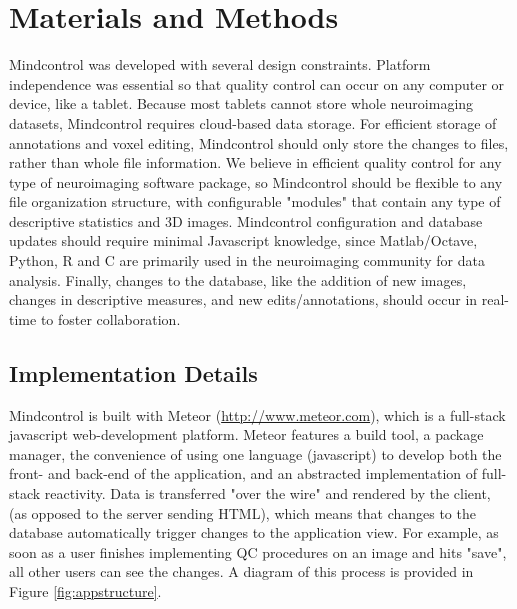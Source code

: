 \section{Materials and Methods}

Mindcontrol was developed with several design constraints. Platform independence was essential so that quality control can occur on any computer or device, like a tablet. Because most tablets cannot store whole neuroimaging datasets, Mindcontrol requires cloud-based data storage. For efficient storage of annotations and voxel editing, Mindcontrol should only store the changes to files, rather than whole file information. We believe in efficient quality control for any type of neuroimaging software package, so Mindcontrol should be flexible to any file organization structure, with configurable "modules" that contain any type of descriptive statistics and 3D images. Mindcontrol configuration and database updates should require minimal Javascript knowledge, since Matlab/Octave, Python, R and C are primarily used in the neuroimaging community for data analysis. Finally, changes to the database, like the addition of new images, changes in descriptive measures, and new edits/annotations, should occur in real-time to foster collaboration.  


\subsection{Implementation Details}

Mindcontrol is built with Meteor (\href{http://www.meteor.com}{http://www.meteor.com}), which is a full-stack javascript web-development platform. Meteor features a build tool, a package manager, the convenience of using one language (javascript) to develop both the front- and back-end of the application, and an abstracted implementation of full-stack reactivity. Data is transferred "over the wire" and rendered by the client, (as opposed to the server sending HTML), which means that changes to the database automatically trigger changes to the application view. For example, as soon as a user finishes implementing QC procedures on an image and hits "save", all other users can see the changes. A diagram of this process is provided in Figure \ref{fig:appstructure}.



